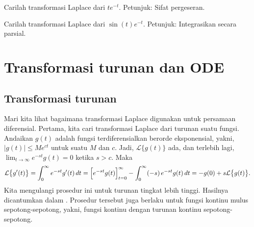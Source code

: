 \begin{exercise}
Carilah transformasi Laplace dari $te^{-t}$.  Petunjuk: Sifat pergeseran.
\end{exercise}

\begin{exercise}
Carilah transformasi Laplace dari $\sin(t)e^{-t}$.  Petunjuk: Integrasikan secara parsial.
\end{exercise}



\sectionnewpage
\section{Transformasi turunan dan ODE}
\label{transformsofders:section}



\subsection{Transformasi turunan}

Mari kita lihat bagaimana transformasi Laplace digunakan untuk persamaan diferensial.
Pertama, kita cari transformasi Laplace dari turunan suatu fungsi.
Andaikan $g(t)$ adalah fungsi terdiferensialkan
berorde eksponensial, yakni, $\lvert g(t) \rvert \leq M e^{ct}$ untuk suatu
$M$ dan $c$.  Jadi, $\mathcal{L} \bigl\{ g(t) \bigr\}$ ada, dan terlebih lagi,
$\lim_{t\to\infty} e^{-st}g(t) = 0$ ketika $s > c$.  Maka
\begin{equation*}
\mathcal{L} \bigl\{ g'(t) \bigr\}
=
\int_0^\infty
e^{-st}
g'(t) \,dt
=
\Bigl[e^{-st} g(t) \Bigr]_{t=0}^\infty
-
\int_0^\infty
(-s)\,
e^{-st}
g(t) \,dt
=
-g(0) + s \mathcal{L} \bigl\{ g(t) \bigr\} .
\end{equation*}
Kita mengulangi prosedur ini untuk turunan tingkat lebih tinggi.
Hasilnya
dicantumkan dalam .  Prosedur tersebut juga berlaku untuk fungsi kontinu mulus
sepotong-sepotong, yakni, fungsi kontinu dengan turunan
kontinu sepotong-sepotong.

